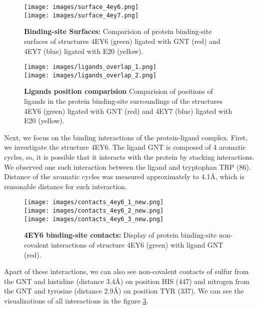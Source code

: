 \documentclass[10pt,a4paper,twocolumn]{article}
\begin{document}
\begin{figure}[tb]
    \centering
    \texttt{[image: images/surface\_4ey6.png]}
    \\[\smallskipamount]
    \texttt{[image: images/surface\_4ey7.png]}
    \caption{\textbf{Binding-site Surfaces:} 
    Comparision of protein binding-site surfaces of structures 4EY6 (green) 
    ligated with GNT (red) and 4EY7 (blue) ligated with E20 (yellow).}
    \label{fig:surfaces}
\end{figure} 


\begin{figure}[tb]
    \centering
    \texttt{[image: images/ligands\_overlap\_1.png]}
    \\[\smallskipamount]
    \texttt{[image: images/ligands\_overlap\_2.png]}
    \caption{\textbf{Ligands position comparision} 
    Comparision of positions of ligands in the protein binding-site 
    surroundings of the structures 4EY6 (green) ligated with GNT (red) 
    and 4EY7 (blue) ligated with E20 (yellow).}
    \label{fig:ligands_overlap}
\end{figure} 


Next, we focus on the binding interactions of the protein-ligand 
complex. First, we investigate the structure 4EY6. The ligand GNT
is composed of 4 aromatic cycles, so, it is possible that it interacts
with the protein by stacking interactions. We observed one such
interaction between the ligand and tryptophan TRP (86). Distance of the 
aromatic cycles was measured approximately to 4.1\AA, which is 
reasonable distance for such interaction.

\begin{figure}[tb]
    \centering
    \texttt{[image: images/contacts\_4ey6\_1\_new.png]}
    \\[\smallskipamount]
    \texttt{[image: images/contacts\_4ey6\_2\_new.png]}
    \\[\smallskipamount]
    \texttt{[image: images/contacts\_4ey6\_3\_new.png]}
    \caption{\textbf{4EY6 binding-site contacts:} 
    Display of protein binding-site non-covalent interactions 
    of structure 4EY6 (green) with ligand GNT (red).}
    \label{fig:4ey6_contacts}
\end{figure} 


Apart of these interactions, we can also see non-covalent contacts of 
sulfur from the GNT and histidine (distance 3.4\AA) on position HIS (447) 
and nitrogen from the GNT and tyrosine (distance 2.9\AA) on position TYR (337). 
We can see the visualizations
of all interactions in the figure \ref{fig:4ey6_contacts}. 
\end{document}
